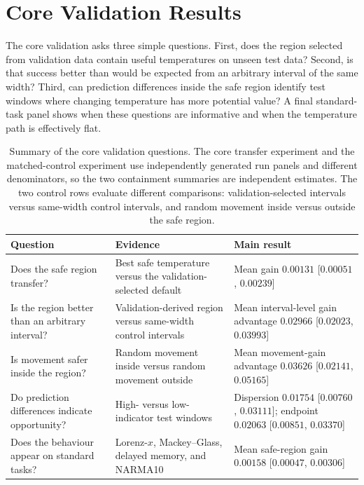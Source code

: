 \documentclass[preprint,12pt,authoryear]{elsarticle}
\begin{document}
\section{Core Validation Results}
\label{sec:core_validation}

The core validation asks three simple questions. First, does the region selected from validation data contain useful temperatures on unseen test data? Second, is that success better than would be expected from an arbitrary interval of the same width? Third, can prediction differences inside the safe region identify test windows where changing temperature has more potential value? A final standard-task panel shows when these questions are informative and when the temperature path is effectively flat.

\begin{table}[t]
\centering
\caption{Summary of the core validation questions. The core transfer experiment and the matched-control experiment use independently generated run panels and different denominators, so the two containment summaries are independent estimates. The two control rows evaluate different comparisons: validation-selected intervals versus same-width control intervals, and random movement inside versus outside the safe region.}
\label{tab:validation_summary}
\small
\begin{tabularx}{\textwidth}{>{\raggedright\arraybackslash}p{}>{\raggedright\arraybackslash}X>{\raggedright\arraybackslash}p{}}
\toprule
Question & Evidence & Main result \\
\midrule
Does the safe region transfer? & Best safe temperature versus the validation-selected default & Mean gain $0.00131$ [$0.00051$, $0.00239$] \\
Is the region better than an arbitrary interval? & Validation-derived region versus same-width control intervals & Mean interval-level gain advantage $0.02966$ [$0.02023$, $0.03993$] \\
Is movement safer inside the region? & Random movement inside versus random movement outside & Mean movement-gain advantage $0.03626$ [$0.02141$, $0.05165$] \\
Do prediction differences indicate opportunity? & High- versus low-indicator test windows & Dispersion $0.01754$ [$0.00760$, $0.03111$]; endpoint $0.02063$ [$0.00851$, $0.03370$] \\
Does the behaviour appear on standard tasks? & Lorenz-$x$, Mackey--Glass, delayed memory, and NARMA10 & Mean safe-region gain $0.00158$ [$0.00047$, $0.00306$] \\
\bottomrule
\end{tabularx}
\end{table}
\end{document}
